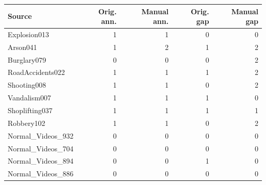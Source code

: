 \begin{tabular}{lrrrr}\toprule Source & Orig. ann. & Manual ann. & Orig. gap & Manual gap\\\midrule
Explosion013 & 1 & 1 & 0 & 0\\
Arson041 & 1 & 2 & 1 & 2\\
Burglary079 & 0 & 0 & 0 & 2\\
RoadAccidents022 & 1 & 1 & 1 & 2\\
Shooting008 & 1 & 1 & 0 & 2\\
Vandalism007 & 1 & 1 & 1 & 0\\
Shoplifting037 & 1 & 1 & 1 & 1\\
Robbery102 & 1 & 1 & 0 & 2\\
Normal\_Videos\_932 & 0 & 0 & 0 & 0\\
Normal\_Videos\_704 & 0 & 0 & 0 & 0\\
Normal\_Videos\_894 & 0 & 0 & 1 & 0\\
Normal\_Videos\_886 & 0 & 0 & 0 & 0\\
\bottomrule\end{tabular}

